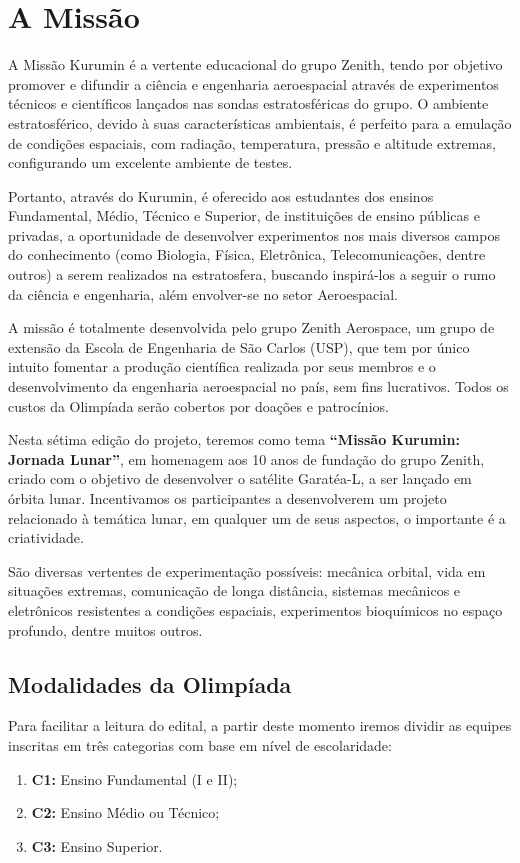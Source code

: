 \section{A Missão} 
    A Missão Kurumin é a vertente educacional do grupo Zenith, tendo por objetivo promover e difundir a ciência e engenharia aeroespacial através de experimentos técnicos e científicos lançados nas sondas estratosféricas do grupo. O ambiente estratosférico, devido à suas características ambientais, é perfeito para a emulação de condições espaciais, com radiação, temperatura, pressão e altitude extremas, configurando um excelente ambiente de testes.
    
    Portanto, através do Kurumin, é oferecido aos estudantes dos ensinos Fundamental, Médio, Técnico e Superior, de instituições de ensino públicas e privadas, a oportunidade de desenvolver experimentos nos mais diversos campos do conhecimento (como Biologia, Física, Eletrônica, Telecomunicações, dentre outros) a serem realizados na estratosfera, buscando inspirá-los a seguir o rumo da ciência e engenharia, além envolver-se no setor Aeroespacial.
    
    A missão é totalmente desenvolvida pelo grupo Zenith Aerospace, um grupo de extensão da Escola de Engenharia de São Carlos (USP), que tem por único intuito fomentar a produção científica realizada por seus membros e o desenvolvimento da engenharia aeroespacial no país, sem fins lucrativos. Todos os custos da Olimpíada serão cobertos por doações e patrocínios.
    
    Nesta sétima edição do projeto, teremos como tema \textbf{“Missão Kurumin: Jornada Lunar”}, em homenagem aos 10 anos de fundação do grupo Zenith, criado com o objetivo de desenvolver o satélite Garatéa-L, a ser lançado em órbita lunar. Incentivamos os participantes a desenvolverem um projeto relacionado à temática lunar, em qualquer um de seus aspectos, o importante é a criatividade.
    
    São diversas vertentes de experimentação possíveis: mecânica orbital, vida em situações extremas, comunicação de longa distância, sistemas mecânicos e eletrônicos resistentes a condições espaciais, experimentos bioquímicos no espaço profundo, dentre muitos outros.

    
    \subsection{Modalidades da Olimpíada} \label{sec:modalidades}
        Para facilitar a leitura do edital, a partir deste momento iremos dividir as equipes inscritas em três categorias com base em nível de escolaridade:
        \begin{enumerate}
            \item \textbf{C1:} Ensino Fundamental (I e II);
            \item \textbf{C2:} Ensino Médio ou Técnico;
            \item \textbf{C3:} Ensino Superior.
        \end{enumerate}

